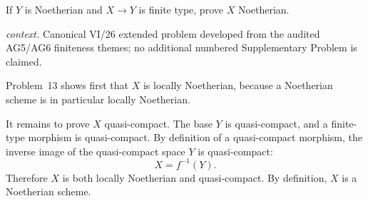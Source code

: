 \begin{problem}\label{prob:vi26-p14}
If \(Y\) is Noetherian and \(X\to Y\) is finite type, prove \(X\) Noetherian.
\par\smallskip\noindent\textit{context.} Canonical VI/26 extended problem developed from the audited AG5/AG6 finiteness themes; no additional numbered Supplementary Problem is claimed.
\end{problem}

\ifdefined\FullProblemDossiers
\begin{solution}
Problem~13 shows first that \(X\) is locally Noetherian, because a Noetherian scheme is in particular
locally Noetherian.

It remains to prove \(X\) quasi-compact.  The base \(Y\) is quasi-compact, and a finite-type
morphism is quasi-compact.  By definition of a quasi-compact morphism, the inverse image of the
quasi-compact space \(Y\) is quasi-compact:
\[
X=f^{-1}(Y).
\]
Therefore \(X\) is both locally Noetherian and quasi-compact.  By definition, \(X\) is a Noetherian
scheme.
\end{solution}
\fi
